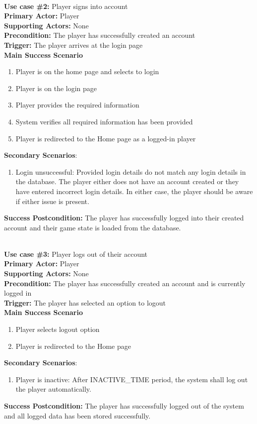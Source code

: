 \documentclass{article}
\begin{document}
\noindent\\
\textbf{Use case \#2:} Player signs into account\\
\textbf{Primary Actor:} Player\\
\textbf{Supporting Actors:} None\\
\textbf{Precondition:} The player has successfully created an account\\
\textbf{Trigger:} The player arrives at the login page\\
\textbf{Main Success Scenario}
\begin{enumerate}
    \item Player is on the home page and selects to login
    \item Player is on the login page
    \item Player provides the required information
    \item System verifies all required information has been provided
    \item Player is redirected to the Home page as a logged-in player
\end{enumerate}
\textbf{Secondary Scenarios}:
\begin{enumerate}
    \item Login unsuccessful: Provided login details do not match any login details in the database. The player either does not have an account created or they have entered incorrect login details. In either case, the player should be aware if either issue is present.
\end{enumerate}
\textbf{Success Postcondition:} The player has successfully logged into their created account and their game state is loaded from the database. \newline

\noindent\\
\textbf{Use case \#3:} Player logs out of their account\\
\textbf{Primary Actor:} Player\\
\textbf{Supporting Actors:} None\\
\textbf{Precondition:} The player has successfully created an account and is currently logged in\\
\textbf{Trigger:} The player has selected an option to logout\\
\textbf{Main Success Scenario}
\begin{enumerate}
    \item Player selects logout option
    \item Player is redirected to the Home page
\end{enumerate}
\textbf{Secondary Scenarios}:
\begin{enumerate}
    \item Player is inactive: After INACTIVE\_TIME period, the system shall log out the player automatically. 
\end{enumerate}
\textbf{Success Postcondition:} The player has successfully logged out of the system and all logged data has been stored successfully. \newline
\end{document}
